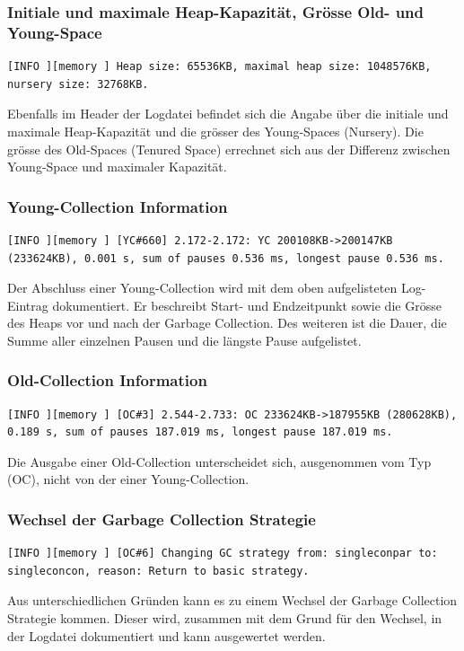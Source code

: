 \subsubsection{Initiale und maximale Heap-Kapazität, Grösse Old- und Young-Space}
\begin{lstlisting}[numbers=none,  framexleftmargin=0mm, caption=Logdatei: Initiale und maximale Heap-Kapazität und Grösse des Old- und Young-Spaces]
[INFO ][memory ] Heap size: 65536KB, maximal heap size: 1048576KB, nursery size: 32768KB.
\end{lstlisting}
Ebenfalls im Header der Logdatei befindet sich die Angabe über die initiale und maximale Heap-Kapazität und die grösser des Young-Spaces (Nursery). Die grösse des Old-Spaces (Tenured Space) errechnet sich aus der Differenz zwischen Young-Space und maximaler Kapazität.

\subsubsection{Young-Collection Information}
\begin{lstlisting}[numbers=none,  framexleftmargin=0mm, caption=Logdatei: Information Young-Collection]
[INFO ][memory ] [YC#660] 2.172-2.172: YC 200108KB->200147KB (233624KB), 0.001 s, sum of pauses 0.536 ms, longest pause 0.536 ms.
\end{lstlisting}
Der Abschluss einer Young-Collection wird mit dem oben aufgelisteten Log-Eintrag dokumentiert. Er beschreibt Start- und Endzeitpunkt sowie die Grösse des Heaps vor und nach der Garbage Collection. Des weiteren ist die Dauer, die Summe aller einzelnen Pausen und die längste Pause aufgelistet. 

\subsubsection{Old-Collection Information}
\begin{lstlisting}[numbers=none,  framexleftmargin=0mm, caption=Logdatei: Information Old-Collection]
[INFO ][memory ] [OC#3] 2.544-2.733: OC 233624KB->187955KB (280628KB), 0.189 s, sum of pauses 187.019 ms, longest pause 187.019 ms.
\end{lstlisting}
Die Ausgabe einer Old-Collection unterscheidet sich, ausgenommen vom Typ (OC),  nicht von der einer Young-Collection.

\subsubsection{Wechsel der Garbage Collection Strategie}
\begin{lstlisting}[numbers=none,  framexleftmargin=0mm, caption=Logdatei: Wechsel Garbage Collection Strategie]
[INFO ][memory ] [OC#6] Changing GC strategy from: singleconpar to: singleconcon, reason: Return to basic strategy.
\end{lstlisting}
Aus unterschiedlichen Gründen kann es zu einem Wechsel der Garbage Collection Strategie kommen. Dieser wird, zusammen mit dem Grund für den Wechsel, in der Logdatei dokumentiert und kann ausgewertet werden.


